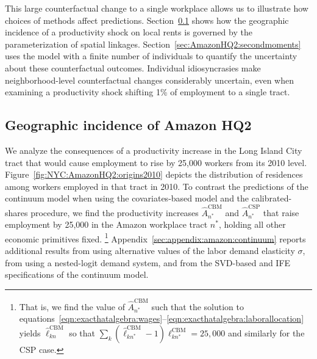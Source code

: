 \documentclass[11pt]{article}
\theoremstyle{definition}
\begin{document}
This large counterfactual change to a single workplace allows us to 
illustrate how choices of methods affect predictions.
Section~\ref{sec:AmazonHQ2:firstmoments} shows how the geographic incidence of a productivity shock on local rents is governed by the parameterization of spatial linkages.
Section~\ref{sec:AmazonHQ2:secondmoments} uses the model with a finite number of individuals to quantify the uncertainty about these counterfactual outcomes.
Individual idiosyncrasies make neighborhood-level counterfactual changes considerably uncertain,
even when examining a productivity shock shifting 1\% of employment to a single tract.

\subsection{Geographic incidence of Amazon HQ2}\label{sec:AmazonHQ2:firstmoments}

We analyze the consequences of a productivity increase in the Long Island City tract that would cause employment to rise by 25,000 workers from its 2010 level.
Figure~\ref{fig:NYC:AmazonHQ2:origins2010} depicts the distribution of residences among workers employed in that tract in 2010.
To contrast the predictions of the continuum model
when using the covariates-based model and the calibrated-shares procedure,
we find the productivity increases $\hat{A}^{\text{CBM}}_{n^*}$ and $\hat{A}^{\text{CSP}}_{n^*}$
that raise employment by 25,000 in the Amazon workplace tract $n^{*}$, 
holding all other economic primitives fixed.%
\footnote{That is, we find the value of $\hat{A}^{\text{CBM}}_{n^*}$ such that the solution to equations~\eqref{eqn:exacthatalgebra:wages}--\eqref{eqn:exacthatalgebra:laborallocation} yields $\hat{\ell}^{\text{CBM}}_{kn}$ so that $\sum_{k} (\hat{\ell}^{\text{CBM}}_{kn^*} - 1){\ell}^{\text{CBM}}_{kn^*}  = 25,000$ and similarly for the CSP case.}
Appendix~\ref{sec:appendix:amazon:continuum} reports additional results 
from using alternative values of the labor demand elasticity $\sigma$,
from using a nested-logit demand system,
and 
from the SVD-based and IFE specifications of the continuum model.
\end{document}
